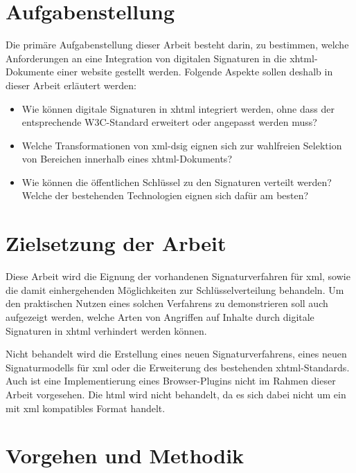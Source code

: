 \section{Aufgabenstellung}
%
\label{sec:Einleitung:aufgabenstellung}
Die primäre Aufgabenstellung dieser Arbeit besteht darin, zu bestimmen, welche Anforderungen an eine Integration von digitalen Signaturen in die
\gls{xhtml}-Dokumente einer \gls{website} gestellt werden. Folgende Aspekte sollen deshalb in dieser Arbeit erläutert werden:
\begin{itemize}
    \item Wie können digitale Signaturen in \gls{xhtml} integriert werden, ohne dass der entsprechende W3C-Standard \cite{xhtml:w3c} erweitert oder angepasst
    werden muss?
    \item Welche Transformationen von \gls{xml-dsig} eignen sich zur wahlfreien Selektion von Bereichen innerhalb eines \gls{xhtml}-Dokuments?
    \item Wie können die öffentlichen Schlüssel zu den Signaturen verteilt werden? Welche der bestehenden Technologien eignen sich dafür am besten?
\end{itemize}

\section{Zielsetzung der Arbeit}
\label{sec:Einleitung:ziele}
Diese Arbeit wird die Eignung der vorhandenen Signaturverfahren für \gls{xml}, sowie die damit einhergehenden Möglichkeiten zur Schlüsselverteilung
behandeln. Um den praktischen Nutzen eines solchen Verfahrens zu demonstrieren soll auch aufgezeigt werden, welche Arten von Angriffen auf Inhalte durch
digitale Signaturen in \gls{xhtml} verhindert werden können.

Nicht behandelt wird die Erstellung eines neuen Signaturverfahrens, eines neuen Signaturmodells für \gls{xml} oder die Erweiterung des bestehenden
\gls{xhtml}-Standards. Auch ist eine Implementierung eines Browser-Plugins nicht im Rahmen dieser Arbeit vorgesehen. Die \gls{html} wird nicht behandelt, da es
sich dabei nicht um ein mit \gls{xml} kompatibles Format handelt.

\section{Vorgehen und Methodik}
\label{sec:Einleitung:methodik}


